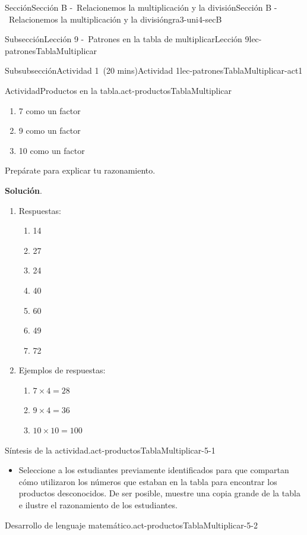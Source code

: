 \documentclass[oneside,10pt,]{article}
\newcommand{\blocktitlefont}{\relax}
\begin{document}
\begin{sectionptx}{Sección}{Sección B -~Relacionemos la multiplicación y la división}{}{Sección B -~Relacionemos la multiplicación y la división}{}{}{gra3-uni4-secB}
\begin{subsectionptx}{Subsección}{Lección 9 -~Patrones en la tabla de multiplicar}{}{Lección 9}{}{}{lec-patronesTablaMultiplicar}
\begin{subsubsectionptx}{Subsubsección}{Actividad 1~(20 mins)}{}{Actividad 1}{}{}{lec-patronesTablaMultiplicar-act1}
\begin{activity}{Actividad}{Productos en la tabla.}{act-productosTablaMultiplicar}
\begin{enumerate}
%
\begin{enumerate}
\item{}7 como un factor%
\item{}9 como un factor%
\item{}10 como un factor%
\end{enumerate}
Prepárate para explicar tu razonamiento.%
\end{enumerate}
\par\smallskip%
\noindent\textbf{\blocktitlefont Solución}.\hypertarget{act-productosTablaMultiplicar-3}{}\quad{}%
\begin{enumerate}
\item{}Respuestas:%
%
\begin{multicols}{3}
\begin{enumerate}[label={\Alph*}]
\item{}14%
\item{}27%
\item{}24%
\item{}40%
\item{}60%
\item{}49%
\item{}72%
\end{enumerate}
\end{multicols}
\item{}Ejemplos de respuestas:%
%
\begin{enumerate}
\item{}\(\displaystyle 7 \times 4 = 28\)%
\item{}\(\displaystyle 9 \times 4 = 36\)%
\item{}\(\displaystyle 10 \times 10 = 100\)%
\end{enumerate}
\end{enumerate}
\end{activity}%
\par
\begin{paragraphs}{Síntesis de la actividad.}{act-productosTablaMultiplicar-5-1}%
%
\begin{itemize}[label=\textbullet]
\item{}Seleccione a los estudiantes previamente identificados para que compartan cómo utilizaron los números que estaban en la tabla para encontrar los productos desconocidos. De ser posible, muestre una copia grande de la tabla e ilustre el razonamiento de los estudiantes.%
\end{itemize}
\end{paragraphs}%
\begin{paragraphs}{Desarrollo de lenguaje matemático.}{act-productosTablaMultiplicar-5-2}%

\end{paragraphs}
\end{subsubsectionptx}
\end{subsectionptx}
\end{sectionptx}
\end{document}
